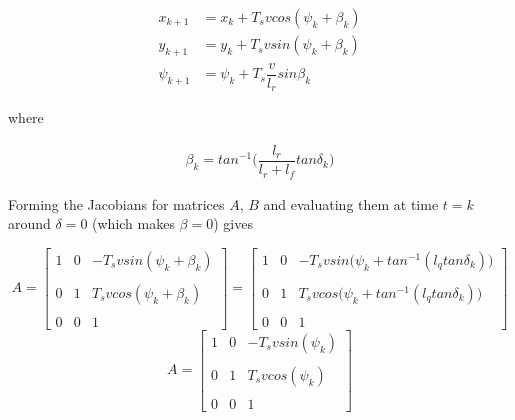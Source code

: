 \begin{align}
  x_{k+1} &= x_{k} + T_s v cos(\psi_k + \beta_k) \\
  y_{k+1} &= y_{k} + T_s v sin(\psi_k + \beta_k) \\
  \psi_{k+1} &= \psi_{k} + T_s \dfrac{v}{l_r} sin\beta_k
\end{align}

where

\begin{align}
  \beta_k = tan^{-1}\Big(\dfrac{l_r}{l_r + l_f} tan\delta_k\Big)
\end{align}


Forming the Jacobians for matrices $A$, $B$ and evaluating them at time
$t=k$ around $\delta = 0$ (which makes $\beta = 0$) gives

\begin{equation}
 A =
  \begin{bmatrix}
    1 & 0 & -T_s v sin(\psi_k + \beta_k) \\\\
    0 & 1 & T_s v cos(\psi_k + \beta_k) \\\\
    0 & 0 & 1
  \end{bmatrix}
  =
  \begin{bmatrix}
    1 & 0 & -T_s v sin\Big(\psi_k + tan^{-1} (l_q tan\delta_k)\Big) \\\\
    0 & 1 & T_s v cos\Big(\psi_k + tan^{-1} (l_q tan\delta_k)\Big) \\\\
    0 & 0 & 1
  \end{bmatrix}
\end{equation}
\begin{equation}
 A =
  \begin{bmatrix}
    1 & 0 & -T_s v sin(\psi_k) \\\\
    0 & 1 & T_s v cos(\psi_k) \\\\
    0 & 0 & 1
  \end{bmatrix}
\end{equation}


